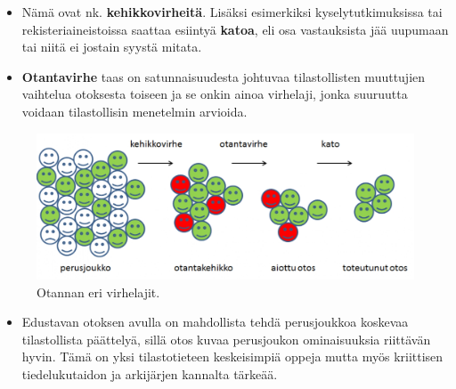 \documentclass[
]{book}
\providecommand{\tightlist}{%
  \setlength{\itemsep}{0pt}\setlength{\parskip}{0pt}}
\begin{document}
\begin{itemize}
\begin{itemize}
    \begin{itemize}
    \tightlist
    \item
      Nämä ovat nk. \textbf{kehikkovirheitä}. Lisäksi esimerkiksi kyselytutkimuksissa tai rekisteriaineistoissa saattaa esiintyä \textbf{katoa}, eli osa vastauksista jää uupumaan tai niitä ei jostain syystä mitata.
    \item
      \textbf{Otantavirhe} taas on satunnaisuudesta johtuvaa tilastollisten muuttujien vaihtelua otoksesta toiseen ja se onkin ainoa virhelaji, jonka suuruutta voidaan tilastollisin menetelmin arvioida.
    \end{itemize}
  \end{itemize}
\end{itemize}

\begin{figure}

{\centering \includegraphics[width=1\linewidth]{images/otanta} 

}

\caption{Otannan eri virhelajit.}\label{fig:otanta}
\end{figure}

\begin{itemize}
\tightlist
\item
  Edustavan otoksen avulla on mahdollista tehdä perusjoukkoa koskevaa tilastollista päättelyä, sillä otos kuvaa perusjoukon ominaisuuksia riittävän hyvin. Tämä on yksi tilastotieteen keskeisimpiä oppeja mutta myös kriittisen tiedelukutaidon ja arkijärjen kannalta tärkeää.
\end{itemize}
\end{document}
